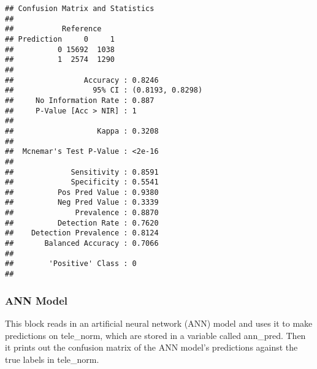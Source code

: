 \documentclass[
]{article}
\newenvironment{Shaded}{\begin{snugshade}}{\end{snugshade}}
\newcommand{\DecValTok}[1]{\textcolor[rgb]{0.00,0.00,0.81}{#1}}
\newcommand{\FloatTok}[1]{\textcolor[rgb]{0.00,0.00,0.81}{#1}}
\newcommand{\FunctionTok}[1]{\textcolor[rgb]{0.00,0.00,0.00}{#1}}
\newcommand{\NormalTok}[1]{#1}
\newcommand{\OtherTok}[1]{\textcolor[rgb]{0.56,0.35,0.01}{#1}}
\newcommand{\SpecialCharTok}[1]{\textcolor[rgb]{0.00,0.00,0.00}{#1}}
\newcommand{\StringTok}[1]{\textcolor[rgb]{0.31,0.60,0.02}{#1}}
\begin{document}
\begin{verbatim}
## Confusion Matrix and Statistics
## 
##           Reference
## Prediction     0     1
##          0 15692  1038
##          1  2574  1290
##                                           
##                Accuracy : 0.8246          
##                  95% CI : (0.8193, 0.8298)
##     No Information Rate : 0.887           
##     P-Value [Acc > NIR] : 1               
##                                           
##                   Kappa : 0.3208          
##                                           
##  Mcnemar's Test P-Value : <2e-16          
##                                           
##             Sensitivity : 0.8591          
##             Specificity : 0.5541          
##          Pos Pred Value : 0.9380          
##          Neg Pred Value : 0.3339          
##              Prevalence : 0.8870          
##          Detection Rate : 0.7620          
##    Detection Prevalence : 0.8124          
##       Balanced Accuracy : 0.7066          
##                                           
##        'Positive' Class : 0               
## 
\end{verbatim}

\hypertarget{ann-model}{%
\subsubsection{ANN Model}\label{ann-model}}

This block reads in an artificial neural network (ANN) model and uses it
to make predictions on tele\_norm, which are stored in a variable called
ann\_pred. Then it prints out the confusion matrix of the ANN model's
predictions against the true labels in tele\_norm.

\begin{Shaded}
\end{Shaded}
\end{document}
